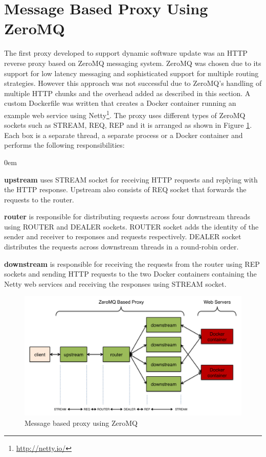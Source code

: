 \documentclass[a4paper,11pt,twoside]{report}
\begin{document}
\section{Message Based Proxy Using ZeroMQ}\label{zeromq_section}
The first proxy developed to support dynamic software update was an HTTP reverse proxy based on ZeroMQ messaging system. ZeroMQ was chosen due to its support for low latency messaging and sophisticated support for multiple routing strategies.  However this approach was not successful due to ZeroMQ's handling of multiple HTTP chunks and the overhead added as described in this section.
A custom Dockerfile was written that creates a Docker container running an example web service using Netty\footnote{\url{http://netty.io/}}. The proxy uses different types of ZeroMQ sockets such as STREAM, REQ, REP and it is arranged as shown in Figure \ref{prototype}. Each box is a separate thread, a separate process or a Docker container and performs the following responsibilities:
 
\begin{list}{-}{}
  \itemsep0em
  \item \textbf{upstream} uses STREAM socket for receiving HTTP requests and replying with the HTTP response. Upstream also consists of REQ socket that forwards the requests to the router. 
  
  \item \textbf{router} is responsible for distributing requests across four downstream threads using ROUTER and DEALER sockets. ROUTER socket adds the identity of the sender and receiver to responses and requests respectively. DEALER socket distributes the requests across downstream threads in a round-robin order.
 
  \item \textbf{downstream} is responsible for receiving the requests from the router using REP sockets and sending HTTP requests to the two Docker containers containing the Netty web services and receiving the responses using STREAM socket.
\end{list}

\begin{figure}[!ht]
  \centering
     \includegraphics[scale=0.31]{prototype}
  \caption{Message based proxy using ZeroMQ}
  \label{prototype}
\end{figure}
\end{document}
